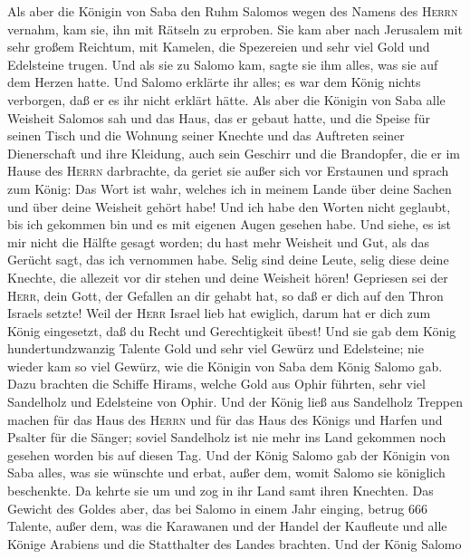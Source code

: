  Als aber die Königin von Saba den Ruhm Salomos wegen des
Namens des \textsc{Herrn} vernahm, kam sie, ihn mit Rätseln zu erproben.
 Sie kam aber nach Jerusalem mit sehr großem Reichtum, mit
Kamelen, die Spezereien und sehr viel Gold und Edelsteine trugen. Und
als sie zu Salomo kam, sagte sie ihm alles, was sie auf dem Herzen
hatte.  Und Salomo erklärte ihr alles; es war dem König
nichts verborgen, daß er es ihr nicht erklärt hätte.  Als
aber die Königin von Saba alle Weisheit Salomos sah und das Haus, das er
gebaut hatte,  und die Speise für seinen Tisch und die
Wohnung seiner Knechte und das Auftreten seiner Dienerschaft und ihre
Kleidung, auch sein Geschirr und die Brandopfer, die er im Hause des
\textsc{Herrn} darbrachte, da geriet sie außer sich vor Erstaunen und
sprach zum König:  Das Wort ist wahr, welches ich in
meinem Lande über deine Sachen und über deine Weisheit gehört habe!
 Und ich habe den Worten nicht geglaubt, bis ich gekommen
bin und es mit eigenen Augen gesehen habe. Und siehe, es ist mir nicht
die Hälfte gesagt worden; du hast mehr Weisheit und Gut, als das Gerücht
sagt, das ich vernommen habe.  Selig sind deine Leute,
selig diese deine Knechte, die allezeit vor dir stehen und deine
Weisheit hören!  Gepriesen sei der \textsc{Herr}, dein
Gott, der Gefallen an dir gehabt hat, so daß er dich auf den Thron
Israels setzte! Weil der \textsc{Herr} Israel lieb hat ewiglich, darum
hat er dich zum König eingesetzt, daß du Recht und Gerechtigkeit übest!
 Und sie gab dem König hundertundzwanzig Talente Gold und
sehr viel Gewürz und Edelsteine; nie wieder kam so viel Gewürz, wie die
Königin von Saba dem König Salomo gab.  Dazu brachten die
Schiffe Hirams, welche Gold aus Ophir führten, sehr viel Sandelholz und
Edelsteine von Ophir.  Und der König ließ aus Sandelholz
Treppen machen für das Haus des \textsc{Herrn} und für das Haus des
Königs und Harfen und Psalter für die Sänger; soviel Sandelholz ist nie
mehr ins Land gekommen noch gesehen worden bis auf diesen Tag.
 Und der König Salomo gab der Königin von Saba alles, was
sie wünschte und erbat, außer dem, womit Salomo sie königlich
beschenkte. Da kehrte sie um und zog in ihr Land samt ihren Knechten.
 Das Gewicht des Goldes aber, das bei Salomo in einem
Jahr einging, betrug 666 Talente,  außer dem, was die
Karawanen und der Handel der Kaufleute und alle Könige Arabiens und die
Statthalter des Landes brachten.  Und der König Salomo
